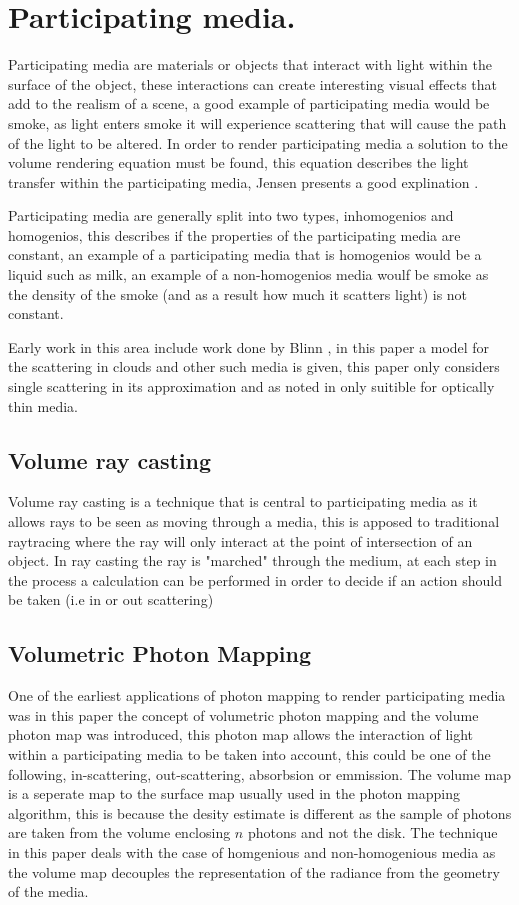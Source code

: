 \section{Participating media.}
Participating media are materials or objects that interact with light within the surface of the
object, these interactions can create interesting visual effects that add to the realism of a 
scene, a good example of participating media would be smoke, as light enters smoke it will
experience scattering that will cause the path of the light to be altered. \cite{Blinn82}
In order to render participating media a solution to the volume rendering equation must be found,
this equation describes the light transfer within the participating media, Jensen presents a
good explination \cite{JensenBook}.

Participating media are generally split into two types, inhomogenios and homogenios, this describes
if the properties of the participating media are constant, an example of a
participating media that is homogenios would be a liquid such as milk, an example of a
non-homogenios media woulf be smoke as the density of the smoke (and as a result how much it scatters
light) is not constant.

Early work in this area include work done by Blinn \cite{Blinn82}, in this paper a model for the
scattering in clouds and other such media is given, this paper only considers single scattering
in its approximation and as noted in \cite{Jensen98} only suitible for optically thin media.

\subsection{Volume ray casting}
Volume ray casting is a technique that is central to participating media as it allows rays to be
seen as moving through a media, this is apposed to traditional raytracing where the ray will only
interact at the point of intersection of an object. In ray casting the ray is "marched" through
the medium, at each step in the process a calculation can be performed in order to decide if an
action should be taken (i.e in or out scattering)

\subsection{Volumetric Photon Mapping}

One of the earliest applications of photon mapping to render participating media was \cite{Jensen98}
in this paper the concept of volumetric photon mapping and the volume photon map was introduced,
this photon map allows the interaction of light within a participating media to be taken into
account, this could be one of the following, in-scattering, out-scattering, absorbsion or emmission.
The volume map is a seperate map to the surface map usually used in the photon mapping algorithm,
this is because the desity estimate is different as the sample of photons are taken from the volume
enclosing $n$ photons and not the disk. The technique in this paper deals with the case of 
homgenious and non-homogenious media as the volume map decouples the representation of the radiance 
from the geometry of the media.

